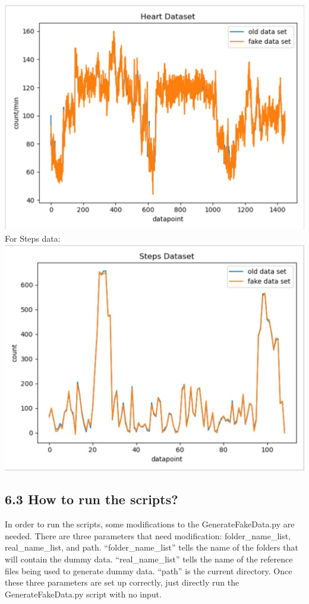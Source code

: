 \documentclass[]{book}
\begin{document}
\includegraphics{./phone_app_doc_images/HeartData.JPG} For Steps data:\\
\includegraphics{./phone_app_doc_images/StepsData.JPG}

\subsection{6.3 How to run the scripts?}\label{how-to-run-the-scripts-1}

In order to run the scripts, some modifications to the
GenerateFakeData.py are needed. There are three parameters that need
modification: folder\_name\_list, real\_name\_list, and path.
``folder\_name\_list'' tells the name of the folders that will contain
the dummy data. ``real\_name\_list'' tells the name of the reference
files being used to generate dummy data. ``path'' is the current
directory. Once these three parameters are set up correctly, just
directly run the GenerateFakeData.py script with no input.
\end{document}
